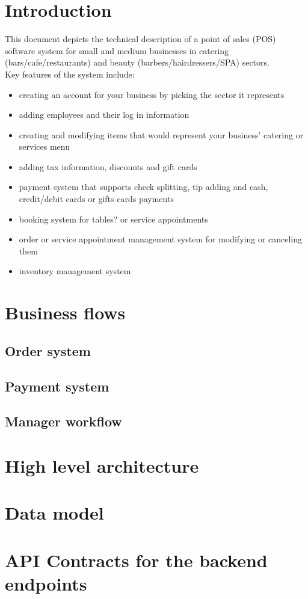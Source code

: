\documentclass{article}
\begin{document}
    
    \newpage
    
    \section{Introduction}
    This document depicts the technical description of a point of sales (POS) software system for small and medium businesses in catering (bars/cafe/restaurants) and beauty (barbers/hairdressers/SPA) sectors.\\[0.2cm] Key features of the system include:
    \begin{itemize}
        \item creating an account for your business by picking the sector it represents
        \item adding employees and their log in information 
        \item creating and modifying items that would represent your business' catering or services menu
        \item adding tax information, discounts and gift cards
        \item payment system that supports check splitting, tip adding and cash, credit/debit cards or gifts cards payments
        \item booking system for tables? or service appointments
        \item order or service appointment management system for modifying or canceling them
        \item inventory management system
    \end{itemize}

    \section{Business flows}
    \subsection{Order system}

    \subsection{Payment system}

    \subsection{Manager workflow}

    \section{High level architecture}

    \section{Data model}

    \section{API Contracts for the backend endpoints}
    
\end{document}
